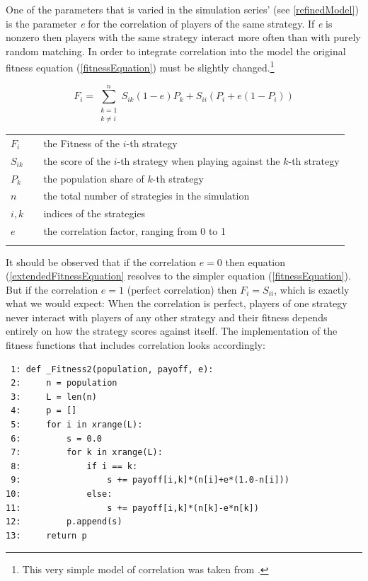 One of the parameters that is varied in the simulation series' (see
\ref{refinedModel}) is the parameter {\em e} for the correlation of players of
the same strategy. If {\em e} is nonzero then players with the same strategy
interact more often than with purely random matching. In order to integrate
correlation into the model the original fitness equation
(\ref{fitnessEquation}) must be slightly changed.\footnote{This very simple
  model of correlation was taken from \cite[p. 113, note 30]{skyrms:1996}.}

\begin{equation}
\label{extendedFitnessEquation}
F_i = \sum_{\substack{k = 1 \\ k \ne i}}^n S_{ik}(1-e)P_k + S_{ii}(P_i +
e(1-P_i))
\end{equation}
\begin{tabular}{lll}
  $F_i$    & &  the Fitness of the $i$-th strategy \\
  $S_{ik}$  & & the score of the $i$-th strategy when playing against
the $k$-th strategy \\
  $P_k$  & & the population share of $k$-th strategy \\
  $n$ & & the total number of strategies in the simulation \\
  $i,k$ & & indices of the strategies \\
  $e$ & & the correlation factor, ranging from 0 to 1 \\
& & \\
\end{tabular}

It should be observed that if the correlation $e=0$ then equation
(\ref{extendedFitnessEquation} resolves to the simpler equation
(\ref{fitnessEquation}). But if the correlation $e=1$ (perfect correlation)
then $F_i = S_{ii}$, which is exactly what we would expect: When the
correlation is perfect, players of one strategy never interact with players
of any other strategy and their fitness depends entirely on how the strategy
scores against itself. The implementation of the fitness functions that
includes correlation looks accordingly:

\begin{scriptsize}
\begin{verbatim}
 1: def _Fitness2(population, payoff, e):
 2:     n = population
 3:     L = len(n) 
 4:     p = []    
 5:     for i in xrange(L):
 6:         s = 0.0
 7:         for k in xrange(L):
 8:             if i == k:
 9:                 s += payoff[i,k]*(n[i]+e*(1.0-n[i]))
10:             else: 
11:                 s += payoff[i,k]*(n[k]-e*n[k])
12:         p.append(s)
13:     return p
\end{verbatim}
\end{scriptsize}

